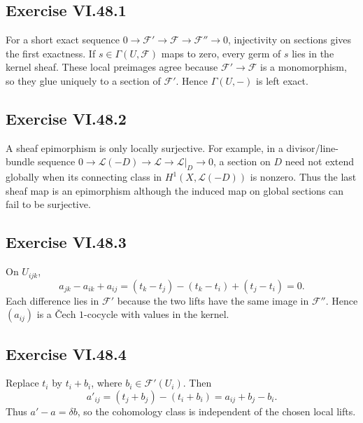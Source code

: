 \subsection*{Exercise VI.48.1}
\begin{solution}
For a short exact sequence \(0\to\mathcal F'\to\mathcal F\to\mathcal F''\to0\), injectivity on sections gives the first exactness.  If \(s\in\Gamma(U,\mathcal F)\) maps to zero, every germ of \(s\) lies in the kernel sheaf.  These local preimages agree because \(\mathcal F'\to\mathcal F\) is a monomorphism, so they glue uniquely to a section of \(\mathcal F'\).  Hence \(\Gamma(U,-)\) is left exact.
\end{solution}

\subsection*{Exercise VI.48.2}
\begin{solution}
A sheaf epimorphism is only locally surjective.  For example, in a divisor/line-bundle sequence \(0\to\mathcal L(-D)\to\mathcal L\to\mathcal L|_D\to0\), a section on \(D\) need not extend globally when its connecting class in \(H^1(X,\mathcal L(-D))\) is nonzero.  Thus the last sheaf map is an epimorphism although the induced map on global sections can fail to be surjective.
\end{solution}

\subsection*{Exercise VI.48.3}
\begin{solution}
On \(U_{ijk}\),
\[
a_{jk}-a_{ik}+a_{ij}
=(t_k-t_j)-(t_k-t_i)+(t_j-t_i)=0.
\]
Each difference lies in \(\mathcal F'\) because the two lifts have the same image in \(\mathcal F''\).  Hence \((a_{ij})\) is a Čech \(1\)-cocycle with values in the kernel.
\end{solution}

\subsection*{Exercise VI.48.4}
\begin{solution}
Replace \(t_i\) by \(t_i+b_i\), where \(b_i\in\mathcal F'(U_i)\).  Then
\[
a'_{ij}=(t_j+b_j)-(t_i+b_i)=a_{ij}+b_j-b_i.
\]
Thus \(a'-a=\delta b\), so the cohomology class is independent of the chosen local lifts.
\end{solution}

